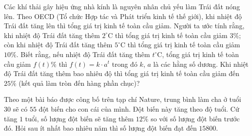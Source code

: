 \begin{ex}%
Các khí thải gây hiệu ứng nhà kính là nguyên nhân chủ yếu làm Trái đất nóng lên. Theo OECD (Tổ chức Hợp tác và Phát triển kinh tế thế giới), khi nhiệt độ Trái đất tăng lên thì tổng giá trị kinh tế toàn cầu giảm. Người ta ước tính rằng, khi nhiệt độ Trái đất tăng thêm $2^{\circ} \mathrm{C}$ thì tổng giá trị kinh tế toàn cầu giảm $3 \%$; còn khi nhiệt độ Trái đất tăng thêm $5^{\circ} \mathrm{C}$ thì tổng giá trị kinh tế toàn cầu giảm $10 \%$. Biết rằng, nếu nhiệt độ Trái đất tăng thêm $t^{\circ} \mathrm{C}$, tổng giá trị kinh tế toàn cầu giảm $f(t) \%$ thì $f(t)=k \cdot a^t$ trong đó $k$, $a$ là các hằng số dương. Khi nhiệt độ Trái đất tăng thêm bao nhiêu độ thì tổng giá trị kinh tế toàn cầu giảm đến $25\%$ (kết quả làm tròn đến hàng phần chục)?
\end{ex}
\begin{ex}%
Theo một bài báo được công bố trên tạp chí Nature, trung bình làm cha ở tuổi $30$ sẽ có $55$ đột biến cho con cái của mình. Đột biến này tăng theo độ tuổi. Cứ tăng $1$ tuổi, số lượng đột biến sẽ tăng thêm $12 \%$ so với số lượng đột biến trước đó. Hỏi sau ít nhất bao nhiêu năm thì số lượng đột biến đạt đến $15800$.
\end{ex}
